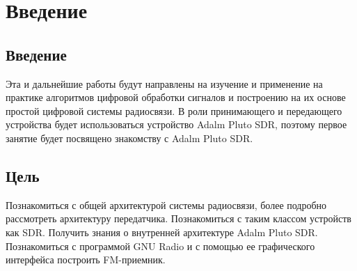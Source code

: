 \chapter{Введение}
\label{ch:intro}

\section{Введение}

Эта и дальнейшие работы будут направлены на изучение и применение на практике алгоритмов цифровой обработки сигналов и построению
на их основе простой цифровой системы радиосвязи. В роли принимающего и передающего устройства будет использоваться устройство 
Adalm Pluto SDR, поэтому первое занятие будет посвящено знакомству с Adalm Pluto SDR.

\section{Цель}  
Познакомиться с общей архитектурой системы радиосвязи, более подробно рассмотреть архитектуру передатчика. 
Познакомиться с таким классом устройств как SDR. Получить знания о внутренней архитектуре Adalm Pluto SDR. Познакомиться
с программой GNU Radio и с помощью ее графического интерфейса построить FM-приемник.

\endinput